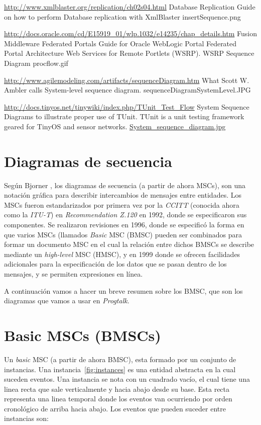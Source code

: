 \url{http://www.xmlblaster.org/replication/ch02s04.html}
Database Replication
Guide on how to perform Database replication with XmlBlaster
insertSequence.png

\url{http://docs.oracle.com/cd/E15919_01/wlp.1032/e14235/chap_details.htm}
Fusion Middleware Federated Portals Guide for Oracle WebLogic Portal
Federated Portal Architecture
Web Services for Remote Portlets (WSRP).
WSRP Sequence Diagram
procflow.gif

\url{http://www.agilemodeling.com/artifacts/sequenceDiagram.htm}
What Scott W. Ambler calls System-level sequence diagram.
sequenceDiagramSystemLevel.JPG


\url{http://docs.tinyos.net/tinywiki/index.php/TUnit_Test_Flow}
System Sequence Diagrams to illustrate proper use of TUnit. TUnit is a unit testing framework geared for TinyOS and sensor networks. 
\url{System_sequence_diagram.jpg}



\section{Diagramas de secuencia}

Según Bjorner \cite{bjorner}, los diagramas de secuencia (a partir de
ahora MSCs),  son una notación gráfica para describir
intercambios de mensajes entre entidades. Los MSCs fueron
estandarizados por primera vez por la \textit{CCITT} (conocida ahora
como la \textit{ITU-T}) en \textit{Recommendation Z.120} en 1992,
donde se especificaron sus componentes.
Se realizaron revisiones en 1996, donde se especificó la
forma en que varios MSCs (llamados \textit{Basic} MSC (BMSC) pueden
ser combinados para formar un documento MSC en el cual la relación entre
dichos BMSCs se describe mediante un \textit{high-level} MSC (HMSC), y
en 1999 donde se ofrecen facilidades adicionales para la
especificación de los datos que se pasan dentro de los mensajes, y se
permiten expresiones en línea.

A continuación vamos a hacer un breve resumen sobre los BMSC, que son
los diagramas que vamos a usar en \textit{Progtalk}.

\section{Basic MSCs (BMSCs)}
Un \textit{basic} MSC (a partir de ahora BMSC), esta formado por un
conjunto de instancias. Una instancia~\ref{fig:instances} es una
entidad abstracta en la cual suceden eventos. Una instancia se nota
con un cuadrado vacío, el cual tiene una linea recta que sale
verticalmente y hacia abajo desde su base. Esta recta representa una
linea temporal donde los eventos van ocurriendo por orden cronológico
de arriba hacia abajo. Los eventos que pueden suceder entre instancias son:

